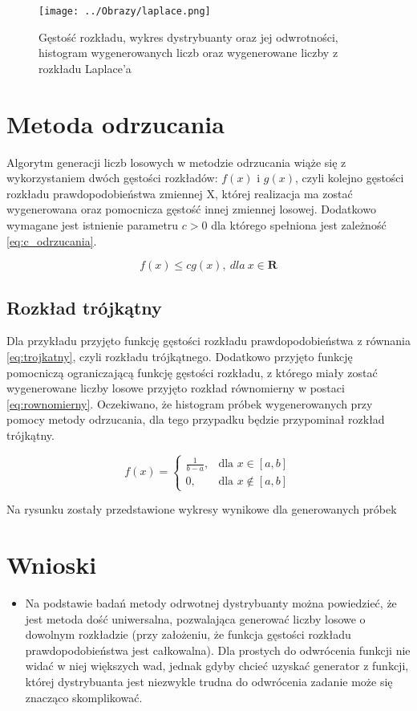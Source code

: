 \documentclass[12pt,a4paper]{article}
\begin{document}
\begin{figure}[H]
\centering
\texttt{[image: ../Obrazy/laplace.png]} 
\caption{Gęstość rozkładu, wykres dystrybuanty oraz jej odwrotności, histogram wygenerowanych liczb oraz wygenerowane liczby z rozkładu Laplace'a}
\label{fig:laplaceL2}
\end{figure}


\section{Metoda odrzucania}
Algorytm generacji liczb losowych w metodzie odrzucania wiąże się z wykorzystaniem dwóch gęstości rozkładów: $f(x)$ i $g(x)$, czyli kolejno gęstości rozkładu prawdopodobieństwa zmiennej X, której realizacja ma zostać wygenerowana oraz pomocnicza gęstość innej zmiennej losowej.
Dodatkowo wymagane jest istnienie parametru $c>0$  dla którego spełniona jest zależność \ref{eq:c_odrzucania}.

\begin{equation}\label{eq:c_odrzucania}
f(x) \leq cg(x),\ dla\ x\in\textbf{R}
\end{equation}

\subsection{Rozkład trójkątny}
Dla przykładu przyjęto funkcję gęstości rozkładu prawdopodobieństwa z równania \ref{eq:trojkatny}, czyli rozkładu trójkątnego.
Dodatkowo przyjęto funkcję pomocniczą ograniczającą funkcję gęstości rozkładu, z którego miały zostać wygenerowane liczby losowe przyjęto rozkład równomierny w postaci \ref{eq:rownomierny}.
Oczekiwano, że histogram próbek wygenerowanych przy pomocy metody odrzucania, dla tego przypadku będzie przypominał rozkład trójkątny.

\begin{equation}\label{eq:rownomierny}
f(x) = \begin{cases} \frac{1}{b-a}, & \mbox{dla } x \in [a,b] \\ 0 , & \mbox{dla } x \not\in [a,b] \end{cases}
\end{equation}

Na rysunku zostały przedstawione wykresy wynikowe dla generowanych próbek


\section{Wnioski}
\begin{itemize}
\item Na podstawie badań metody odrwotnej dystrybuanty można powiedzieć, że jest metoda dość uniwersalna, pozwalająca generować liczby losowe o dowolnym rozkładzie (przy założeniu, że funkcja gęstości rozkładu prawdopodobieństwa jest całkowalna).
Dla prostych do odwrócenia funkcji nie widać w niej większych wad, jednak gdyby chcieć uzyskać generator z funkcji, której dystrybuanta jest niezwykle trudna do odwrócenia zadanie może się znacząco skomplikować.
\end{itemize}
 


\end{document}
